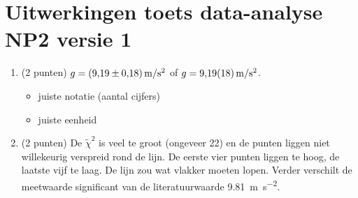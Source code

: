 \documentclass[a4paper,11pt]{article}
\begin{document}
\section*{Uitwerkingen toets data-analyse NP2 versie 1}

\begin{enumerate}
  \item (2 punten) $g = \SI[separate-uncertainty=true]{9,19 +- 0,18}{\meter\per\second\squared}$ of $g = \SI[separate-uncertainty=false]{9,19 +- 0,18}{\meter\per\second\squared}$.
  \begin{itemize}
    \item juiste notatie (aantal cijfers)
    \item juiste eenheid
  \end{itemize}
  \item (2 punten) De $\tilde\chi^2$ is veel te groot (ongeveer 22) en de punten liggen niet willekeurig verspreid rond de lijn. De eerste vier punten liggen te hoog, de laatste vijf te laag. De lijn zou wat vlakker moeten lopen. Verder verschilt de meetwaarde significant van de literatuurwaarde \SI{9,81}{\meter\per\second\squared}.


\end{enumerate}
\end{document}
